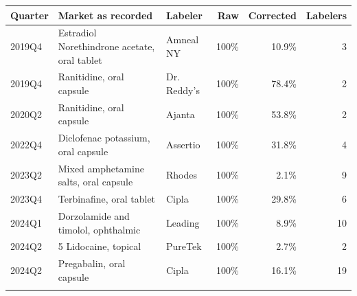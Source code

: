 \begin{tabular}{@{}lp{3.6cm}p{1.9cm}rrr@{}}
\toprule
Quarter & Market as recorded & Labeler & Raw & Corrected & Labelers \\
\midrule
2019Q4 & Estradiol Norethindrone acetate, oral tablet & Amneal NY & 100\% & 10.9\% & 3 \\
2019Q4 & Ranitidine, oral capsule & Dr. Reddy's & 100\% & 78.4\% & 2 \\
2020Q2 & Ranitidine, oral capsule & Ajanta & 100\% & 53.8\% & 2 \\
2022Q4 & Diclofenac potassium, oral capsule & Assertio & 100\% & 31.8\% & 4 \\
2023Q2 & Mixed amphetamine salts, oral capsule & Rhodes & 100\% & 2.1\% & 9 \\
2023Q4 & Terbinafine, oral tablet & Cipla & 100\% & 29.8\% & 6 \\
2024Q1 & Dorzolamide and timolol, ophthalmic & Leading & 100\% & 8.9\% & 10 \\
2024Q2 & 5 Lidocaine, topical & PureTek & 100\% & 2.7\% & 2 \\
2024Q2 & Pregabalin, oral capsule & Cipla & 100\% & 16.1\% & 19 \\
\botrule
\end{tabular}
